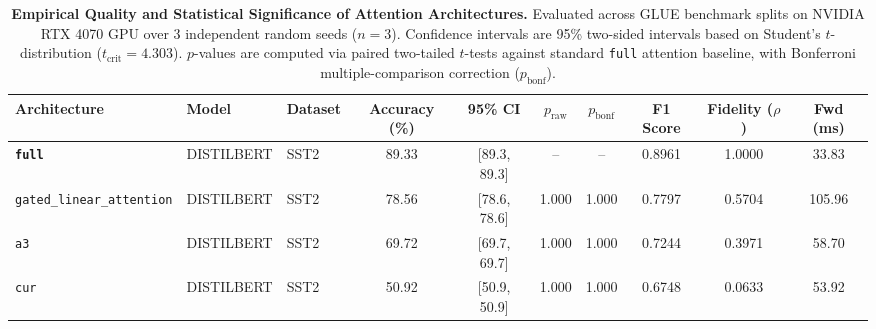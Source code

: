 \begin{table}[t]
\centering
\small
\caption{\textbf{Empirical Quality and Statistical Significance of Attention Architectures.} Evaluated across GLUE benchmark splits on NVIDIA RTX 4070 GPU over 3 independent random seeds ($n=3$). Confidence intervals are 95\% two-sided intervals based on Student's $t$-distribution ($t_{\text{crit}}=4.303$). $p$-values are computed via paired two-tailed $t$-tests against standard \texttt{full} attention baseline, with Bonferroni multiple-comparison correction ($p_{\text{bonf}}$).}
\label{tab:quality_benchmark_results}
\begin{tabular}{l l l c c c c c c c}
\toprule
\textbf{Architecture} & \textbf{Model} & \textbf{Dataset} & \textbf{Accuracy (\%)} & \textbf{95\% CI} & \textbf{$p_{\text{raw}}$} & \textbf{$p_{\text{bonf}}$} & \textbf{F1 Score} & \textbf{Fidelity ($\rho$)} & \textbf{Fwd (ms)} \\
\midrule
\textbf{\texttt{full}} & DISTILBERT & SST2 & 89.33 & [89.3, 89.3] & -- & -- & 0.8961 & 1.0000 & 33.83 \\
\texttt{gated\_linear\_attention} & DISTILBERT & SST2 & 78.56 & [78.6, 78.6] & 1.000 & 1.000 & 0.7797 & 0.5704 & 105.96 \\
\texttt{a3} & DISTILBERT & SST2 & 69.72 & [69.7, 69.7] & 1.000 & 1.000 & 0.7244 & 0.3971 & 58.70 \\
\texttt{cur} & DISTILBERT & SST2 & 50.92 & [50.9, 50.9] & 1.000 & 1.000 & 0.6748 & 0.0633 & 53.92 \\
\bottomrule
\end{tabular}
\end{table}